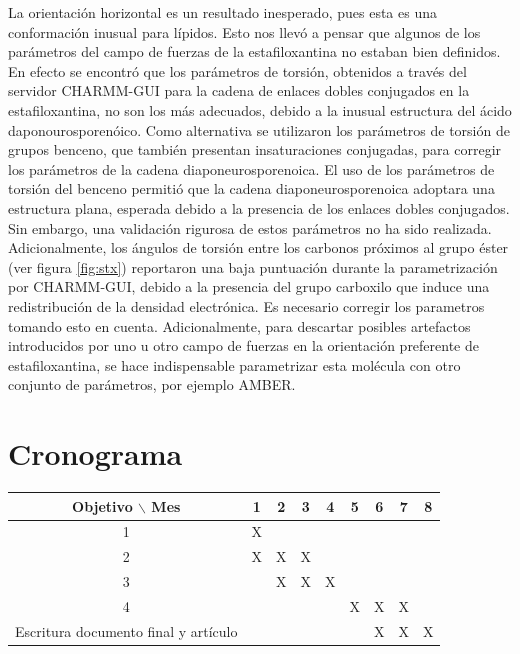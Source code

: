 \documentclass[12pt]{article}
\begin{document}
La orientación horizontal es un resultado inesperado, pues esta es una conformación inusual para lípidos. Esto nos llevó a pensar que algunos de los parámetros del campo de fuerzas de la estafiloxantina no estaban bien definidos. En efecto se encontró que los parámetros de torsión, obtenidos a través del servidor CHARMM-GUI para la cadena de enlaces dobles conjugados en la estafiloxantina, no son los más adecuados, debido a la inusual estructura del ácido daponourosporenóico. Como alternativa se utilizaron los parámetros de torsión de grupos benceno, que también presentan insaturaciones conjugadas, para corregir los parámetros de la cadena diaponeurosporenoica. El uso de los parámetros de torsión del benceno permitió que la cadena diaponeurosporenoica adoptara una estructura plana, esperada debido a la presencia de los enlaces dobles conjugados. Sin embargo, una validación rigurosa de estos parámetros no ha sido realizada. Adicionalmente, los ángulos de torsión entre los carbonos próximos al grupo éster (ver figura \ref{fig:stx}) reportaron una baja puntuación durante la parametrización por CHARMM-GUI, debido a la presencia del grupo carboxilo que induce una redistribución de la densidad electrónica. Es necesario corregir los parametros tomando esto en cuenta. Adicionalmente, para descartar posibles artefactos introducidos por uno u otro campo de fuerzas en la orientación preferente de estafiloxantina, se hace indispensable parametrizar esta molécula con otro conjunto de parámetros, por ejemplo AMBER.



\section{Cronograma}

\begin{table}[htb]
	\begin{tabular}{|c|cccccccc| }
	\hline
	Objetivo $\backslash$ Mes & 1 & 2 & 3 & 4 & 5 & 6 & 7 & 8\\
	\hline
	1 & X &  &  &  &  &  &  &  \\
	2 & X & X & X &  &  &  &  &  \\
	3 &   & X & X & X &   &  &  &  \\
	4 &  &  &  &  & X & X & X & \\
	Escritura documento final y artículo&  &  &  &  &  & X & X & X \\
	\hline
	\end{tabular}
\end{table}
\vspace{3mm}
\end{document}
